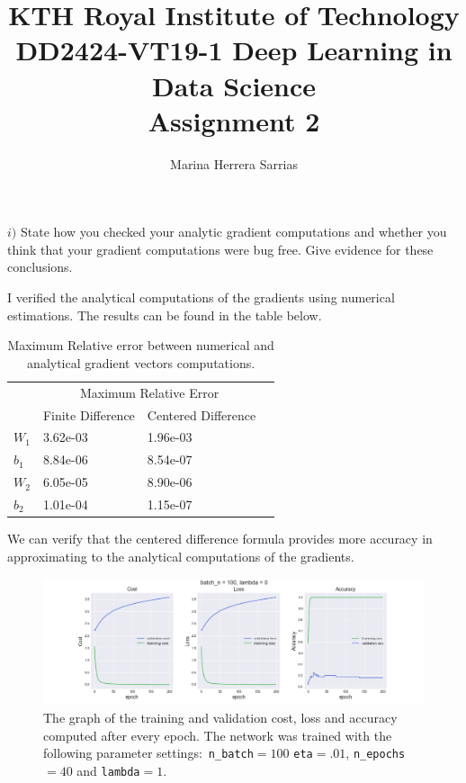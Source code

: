 \documentclass[11pt]{article}
\title{\vspace{-5.0cm}KTH Royal Institute of Technology\\ DD2424-VT19-1 Deep Learning in Data Science\\ Assignment 2}
\author{Marina Herrera Sarrias }
\begin{document}
\maketitle

\begin{tcolorbox}
$i)$ State how you checked your analytic gradient computations and whether you think that your gradient computations were bug free. Give evidence for these conclusions.
\end{tcolorbox}

I verified the analytical computations of the gradients using numerical estimations. The results can be found in the table below.

\begin{table}[H]
	\centering
	\begin{tabular}{llll} 
		\toprule
		& \multicolumn{2}{c}{Maximum Relative Error} &   \\ 
		\cline{2-3}
		& Finite Difference & Centered Difference    &   \\ 
		\cline{2-3}
		$W_{1}$ & 3.62e-03             & 1.96e-03               &   \\
		$b_{1}$ & 8.84e-06          & 8.54e-07               &   \\
		$W_{2}$ & 6.05e-05             & 8.90e-06               &   \\
		$b_{2}$ & 1.01e-04             & 1.15e-07               &   \\
		\bottomrule
	\end{tabular}
\caption{Maximum Relative error between numerical and analytical gradient vectors computations.}
\label{table:1}
\end{table}

We can verify that the centered difference formula provides more accuracy in approximating to the analytical computations of the gradients.

			
\begin{figure}[H]
	\centerline{\includegraphics[width=180mm,scale=0.7]{test1.png}}
	\caption{The graph of the training and validation cost, loss and accuracy computed after every epoch. The network was trained with the following parameter settings$:$ \texttt{n\_batch}$=100$ \texttt{eta}$=.01$, \texttt{n\_epochs}$=40$ and  \texttt{lambda}$=1$.}
	\label{fig:1}
\end{figure}
\end{document}
